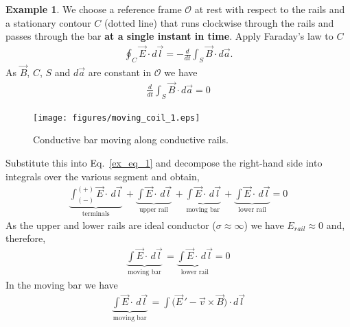 \documentclass[11pt,a4paper,oneside]{book}
\numberwithin{equation}{section}
\theoremstyle{it}
\theoremstyle{definition}
\newtheorem{example}{Example}[section]
\begin{document}
\begin{example}
We choose a reference frame $\mathcal{O}$ at rest with respect to the rails and a stationary contour $C$ (dotted line) that runs clockwise through the rails and passes through the bar \textbf{at a single instant in time}. Apply Faraday's law to $C$
 \begin{equation}\label{ex_eq_1}
	\begin{aligned}
		\oint_C \vec{E}\cdot d\vec{l} = - \frac{d}{dt} \int_S\vec{B}\cdot d\vec{a}.
	\end{aligned}
\end{equation} 
As $\vec{B}$, $C$, $S$ and $d\vec{a}$ are constant in $\mathcal{O}$ we have
 \begin{equation}\label{}
	\begin{aligned}
	\frac{d}{dt} \int_S\vec{B}\cdot d\vec{a} = 0
	\end{aligned}
\end{equation} 
\begin{figure}[H]
	\centering
	\texttt{[image: figures/moving\_coil\_1.eps]}
	\captionsetup{width=0.75\textwidth}		
	\caption{Conductive bar moving along conductive rails.}
	\label{moving_coil_1}
\end{figure}
Substitute this into Eq.~\eqref{ex_eq_1} and decompose the right-hand side into integrals over the various segment and obtain,
\begin{equation}\label{}
	\begin{aligned}
		\underbrace{\int_{(-)}^{(+)}\vec{E}\cdot\,d\vec{l}}_{\text{terminals}} \, + \underbrace{\int\vec{E}\cdot\,d\vec{l}}_{\text{upper rail}} \, + 
		\underbrace{\int\vec{E}\cdot\,d\vec{l}}_{\text{moving bar}} \, + 
		\underbrace{\int\vec{E}\cdot\,d\vec{l}}_{\text{lower rail}} = 0
	\end{aligned}
\end{equation} 
As the upper and lower rails are ideal conductor ($\sigma \approx \infty$) we have $E_{rail} \approx 0$ and, therefore, 
\begin{equation}\label{}
	\begin{aligned}
		\underbrace{\int\vec{E}\cdot\,d\vec{l}}_{\text{moving bar}} \, = 
		\underbrace{\int\vec{E}\cdot\,d\vec{l}}_{\text{lower rail}} = 0
	\end{aligned}
\end{equation} 
In the moving bar we have 
\begin{equation*}\label{}
	\begin{aligned}
		\underbrace{\int\vec{E}\cdot\,d\vec{l}}_{\text{moving bar}} \, = 
		\int\Big(\vec{E}\,'-\vec{v}\times\vec{B}\Big)\cdot d\vec{l}

\end{aligned}
\end{equation*}
\end{example}
\end{document}
